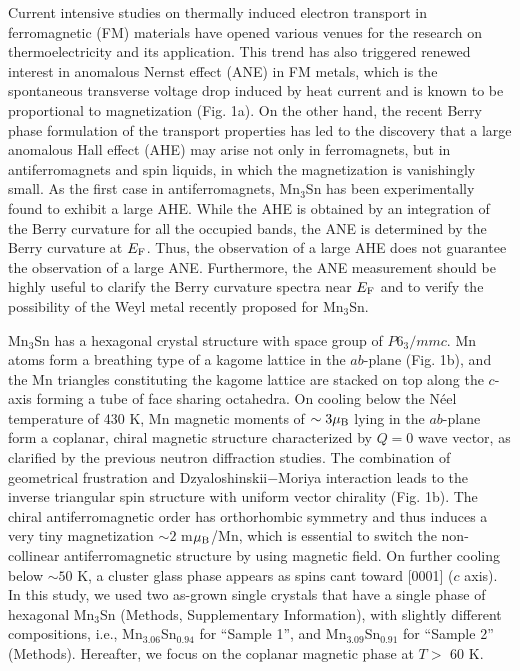 \documentclass[amsmath,amssymb]{nature}
\begin{document}
Current intensive studies on thermally induced electron transport in ferromagnetic (FM) materials have opened various venues for the research on thermoelectricity and its application\cite{Bauer2012,Uchida2008,Slachter2010,Huang2011}. This trend has also triggered renewed interest in anomalous Nernst effect (ANE) in FM metals\cite{Lee2004,Miyasato2007,Yong2008,Huang2011,Sakuraba2013,Hasegawa2015}, which is the spontaneous transverse voltage drop induced by heat current and is known to be proportional to magnetization (Fig. 1a). 
On the other hand, the recent Berry phase formulation of the transport properties has led to the discovery that a large anomalous Hall effect (AHE) may arise not only in ferromagnets, but in antiferromagnets and spin liquids, in which the magnetization is vanishingly small\cite{Nagaosa2010,Bruno2007,Shindou2001,Machida2010,Chen2014,Kubler2014,Mn3Sn,Kiyohara2016,Nayak2016}.
As the first case in antiferromagnets, Mn$_3$Sn has been experimentally found to exhibit a large AHE\cite{Mn3Sn}.  While the AHE is obtained by an integration of the Berry curvature for all the occupied bands, the ANE is determined by the Berry curvature at $E_{\rm F}$\cite{Xiao2006,Niu2010}. Thus, the observation of a large AHE does not guarantee the observation of a large ANE. Furthermore, the ANE measurement should be highly useful to clarify the Berry curvature spectra near $E_{\rm F}$ and to verify the possibility of the Weyl metal recently proposed for Mn$_3$Sn\cite{Yang2016}. 

Mn$_3$Sn has a hexagonal crystal structure with space group of $P6_3/mmc$\cite{Kren1975}. Mn atoms form a breathing type of a kagome lattice in the $ab$-plane (Fig. 1b), and the Mn triangles constituting the kagome lattice are stacked on top along the $c$-axis forming a tube of face sharing octahedra. On cooling below the N\'{e}el temperature of 430 K, Mn magnetic moments of $\sim 3 \mu_{\rm B}$ lying in the $ab$-plane form a coplanar, chiral magnetic structure characterized by $Q=0$ wave vector,  as clarified by the previous neutron diffraction studies\cite{TomiyoshiYamaguchi1982,Brown1990}.  The combination of geometrical frustration and Dzyaloshinskii$-$Moriya interaction leads to the inverse triangular spin structure with uniform vector chirality (Fig. 1b)\cite{TomiyoshiYamaguchi1982,Brown1990,Nagamiya1982}.  The chiral antiferromagnetic order has orthorhombic symmetry and thus induces a very tiny magnetization $\sim 2$ m$\mu_{\rm B}$/Mn, which is essential to switch the non-collinear antiferromagnetic structure by using magnetic field.   On further cooling below $\sim 50$ K, a cluster glass phase appears as spins cant toward [0001] ($c$ axis)\cite{Tomiyoshi1986,Brown1990,Feng2006}.  In this study, we used two as-grown single crystals that have a single phase of hexagonal Mn$_3$Sn \cite{Ohmori1987} (Methods, Supplementary Information), with slightly different compositions, i.e., Mn$_{3.06}$Sn$_{0.94}$ for ``Sample 1'', and  Mn$_{3.09}$Sn$_{0.91}$ for ``Sample 2'' (Methods). Hereafter, we focus on the coplanar magnetic phase at $T >$ 60 K. 
\end{document}
